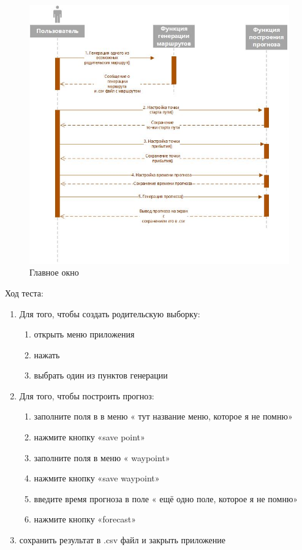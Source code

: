 \documentclass[a4paper,english]{G2-105}
\begin{document}
	\begin{figure}
		\includegraphics[width  = \linewidth]{gradulation_sequence_pic.jpg}
		\caption{Главное окно}\label{main_window}
	\end{figure}
	
	\par Ход теста:
		\begin{enumerate}
			\item Для того, чтобы создать родительскую выборку:
				\begin{enumerate}
					\item открыть меню приложения
					\item нажать %
					\item выбрать один из пунктов генерации
				\end{enumerate}
			\item Для того, чтобы построить прогноз:
				\begin{enumerate}
					\item заполните поля в в меню  « тут название меню, которое я не помню»
					\item нажмите кнопку «save point»
					\item заполните поля в меню « waypoint»
					\item нажмите кнопку «save waypoint»
					\item введите время прогноза в поле « ещё одно поле, которое я не помню»
					\item нажмите кнопку «forecast»
				\end{enumerate}
			\item сохранить результат в .csv файл и закрыть приложение
		\end{enumerate}
		
\end{document}
